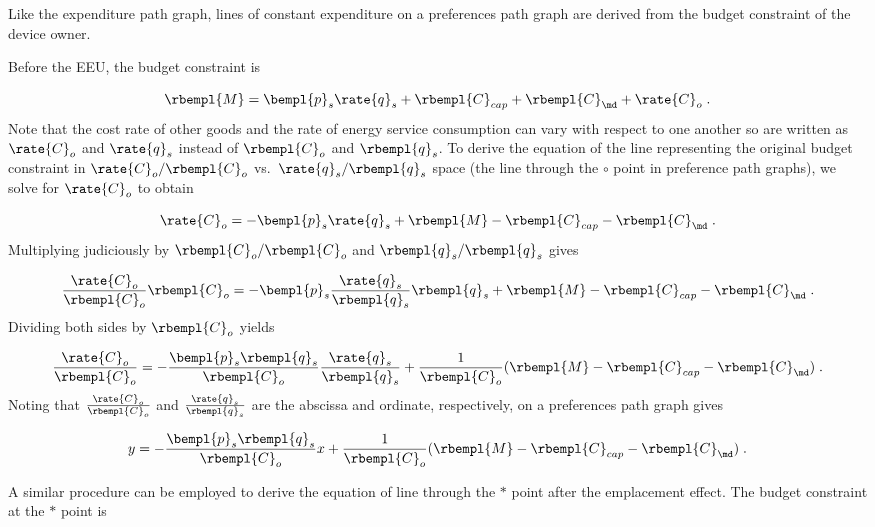 Like the expenditure path graph, 
lines of constant expenditure on a preferences path graph 
are derived from the budget constraint of the device owner.

Before the EEU, the budget constraint is

\begin{equation}
  \rbempl{M} = \bempl{p}_s \rate{q}_s + \rbempl{C}_{cap} + \rbempl{C}_{\md} + \rate{C}_o \; .
\end{equation}
%
Note that the cost rate of other goods and the rate of energy service consumption
can vary with respect to one another so are written as
$\rate{C}_o$ and $\rate{q}_s$
instead of $\rbempl{C}_o$ and $\rbempl{q}_s$.
To derive the equation of the line representing the original budget constraint 
in $\rate{C}_o/\rbempl{C}_o$ vs.\ $\rate{q}_s/\rbempl{q}_s$ space
(the \circcirc{} line through the $\circ$ point
in preference path graphs), 
we solve for $\rate{C}_o$ to obtain

\begin{equation}
  \rate{C}_o = - \bempl{p}_s \rate{q}_s + \rbempl{M} - \rbempl{C}_{cap} - \rbempl{C}_{\md} \; .
\end{equation}
%
Multiplying judiciously by $\rbempl{C}_o/\rbempl{C}_o$ and $\rbempl{q}_s/\rbempl{q}_s$ gives

\begin{equation}
  \frac{\rate{C}_o}{\rbempl{C}_o} \rbempl{C}_o
       = - \bempl{p}_s \frac{\rate{q}_s}{\rbempl{q}_s} \rbempl{q}_s 
         + \rbempl{M} - \rbempl{C}_{cap} - \rbempl{C}_{\md} \; .
\end{equation}
%
Dividing both sides by $\rbempl{C}_o$ yields

\begin{equation}
  \frac{\rate{C}_o}{\rbempl{C}_o}
       = - \frac{\bempl{p}_s \rbempl{q}_s}{\rbempl{C}_o} \frac{\rate{q}_s}{\rbempl{q}_s}
         + \frac{1}{\rbempl{C}_o} (\rbempl{M} - \rbempl{C}_{cap} - \rbempl{C}_{\md}) \; .
\end{equation}
%
Noting that $\frac{\rate{C}_o}{\rbempl{C}_o}$ and 
$\frac{\rate{q}_s}{\rbempl{q}_s}$ are
the abscissa and ordinate, respectively,
on a preferences path graph gives

\begin{equation} \label{eq:orig_line_prefs}
  y = - \frac{\bempl{p}_s \rbempl{q}_s}{\rbempl{C}_o} x
         + \frac{1}{\rbempl{C}_o} (\rbempl{M} - \rbempl{C}_{cap} - \rbempl{C}_{\md}) \; .
\end{equation}

A similar procedure can be employed to derive the equation of 
\starstar{} line through the $*$ point
after the emplacement effect.
The budget constraint at the $*$ point is

